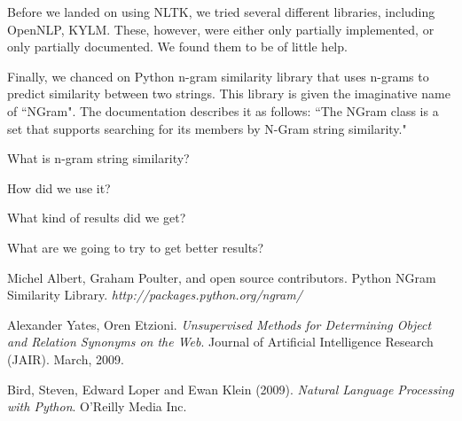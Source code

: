 \documentclass{article}
\begin{document}
Before we landed on using NLTK, we tried several different libraries, including OpenNLP, KYLM. These, however, were either only partially implemented, or only partially documented. We found them to be of little help.

Finally, we chanced on Python n-gram similarity library that uses n-grams to predict similarity between two strings. This library is given the imaginative name of ``NGram". The documentation describes it as follows: ``The NGram class is a set that supports searching for its members by N-Gram string similarity." \cite{py_ngram_lib}

What is n-gram string similarity?

How did we use it?

What kind of results did we get?

What are we going to try to get better results?


\begin{thebibliography}{1}

Michel Albert, Graham Poulter, and open source contributors. Python NGram Similarity Library. \textit{http://packages.python.org/ngram/}

Alexander Yates, Oren Etzioni. \textit{Unsupervised Methods for Determining Object and Relation Synonyms on the Web}. Journal of Artificial Intelligence Research (JAIR). March, 2009.

Bird, Steven, Edward Loper and Ewan Klein (2009). \textit{Natural Language Processing with Python}.  O'Reilly Media Inc.

\end{thebibliography}
\end{document}
